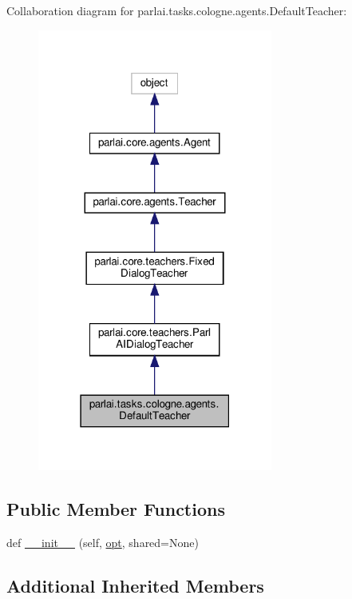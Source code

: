 Collaboration diagram for parlai.\+tasks.\+cologne.\+agents.\+Default\+Teacher\+:
\nopagebreak
\begin{figure}[H]
\begin{center}
\leavevmode
\includegraphics[width=219pt]{dd/d0a/classparlai_1_1tasks_1_1cologne_1_1agents_1_1DefaultTeacher__coll__graph}
\end{center}
\end{figure}
\subsection*{Public Member Functions}
\begin{DoxyCompactItemize}
\item 
def \hyperlink{classparlai_1_1tasks_1_1cologne_1_1agents_1_1DefaultTeacher_ad318d4fbe6bd62f2bafb48324d4c4efe}{\+\_\+\+\_\+init\+\_\+\+\_\+} (self, \hyperlink{classparlai_1_1core_1_1agents_1_1Teacher_a3ce6243860ce978a897922863ed32fa4}{opt}, shared=None)
\end{DoxyCompactItemize}
\subsection*{Additional Inherited Members}


